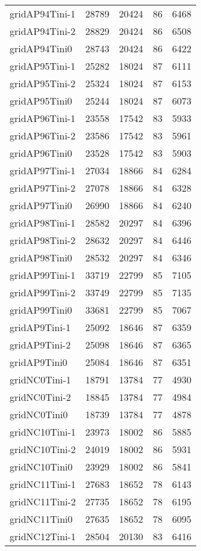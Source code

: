\begin{longtable}{lrrrr}
gridAP94Tini-1 & 28789 & 20424 & 86 & 6468 \\
gridAP94Tini-2 & 28829 & 20424 & 86 & 6508 \\
gridAP94Tini0 & 28743 & 20424 & 86 & 6422 \\
gridAP95Tini-1 & 25282 & 18024 & 87 & 6111 \\
gridAP95Tini-2 & 25324 & 18024 & 87 & 6153 \\
gridAP95Tini0 & 25244 & 18024 & 87 & 6073 \\
gridAP96Tini-1 & 23558 & 17542 & 83 & 5933 \\
gridAP96Tini-2 & 23586 & 17542 & 83 & 5961 \\
gridAP96Tini0 & 23528 & 17542 & 83 & 5903 \\
gridAP97Tini-1 & 27034 & 18866 & 84 & 6284 \\
gridAP97Tini-2 & 27078 & 18866 & 84 & 6328 \\
gridAP97Tini0 & 26990 & 18866 & 84 & 6240 \\
gridAP98Tini-1 & 28582 & 20297 & 84 & 6396 \\
gridAP98Tini-2 & 28632 & 20297 & 84 & 6446 \\
gridAP98Tini0 & 28532 & 20297 & 84 & 6346 \\
gridAP99Tini-1 & 33719 & 22799 & 85 & 7105 \\
gridAP99Tini-2 & 33749 & 22799 & 85 & 7135 \\
gridAP99Tini0 & 33681 & 22799 & 85 & 7067 \\
gridAP9Tini-1 & 25092 & 18646 & 87 & 6359 \\
gridAP9Tini-2 & 25098 & 18646 & 87 & 6365 \\
gridAP9Tini0 & 25084 & 18646 & 87 & 6351 \\
gridNC0Tini-1 & 18791 & 13784 & 77 & 4930 \\
gridNC0Tini-2 & 18845 & 13784 & 77 & 4984 \\
gridNC0Tini0 & 18739 & 13784 & 77 & 4878 \\
gridNC10Tini-1 & 23973 & 18002 & 86 & 5885 \\
gridNC10Tini-2 & 24019 & 18002 & 86 & 5931 \\
gridNC10Tini0 & 23929 & 18002 & 86 & 5841 \\
gridNC11Tini-1 & 27683 & 18652 & 78 & 6143 \\
gridNC11Tini-2 & 27735 & 18652 & 78 & 6195 \\
gridNC11Tini0 & 27635 & 18652 & 78 & 6095 \\
gridNC12Tini-1 & 28504 & 20130 & 83 & 6416 \\

\end{longtable}
